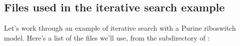 



\subsection{Files used in the iterative search example}

Let's work through an example of iterative search with a Purine
riboswitch model. Here's a list of the files we'll use, from the
 subdirectory of :

